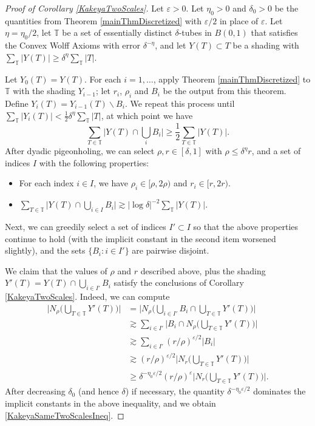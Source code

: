 \documentclass[letterpaper, reqno,11pt]{article}
\numberwithin{equation}{section}
\newcommand{\eps}{\varepsilon}
\newcommand{\tubes}{\mathbb{T}}
\numberwithin{thm}{section}
\theoremstyle{remark}
\begin{document}
\begin{proof}[Proof of Corollary \ref{KakeyaTwoScales}]
Let $\eps>0$. Let $\eta_0>0$ and $\delta_0>0$ be the quantities from Theorem \ref{mainThmDiscretized} with $\eps/2$ in place of $\eps$. Let $\eta=\eta_0/2$, let $\tubes$ be a set of essentially distinct $\delta$-tubes in $B(0,1)$ that satisfies the Convex Wolff Axioms with error $\delta^{-\eta}$, and let $Y(T)\subset T$ be a shading with $\sum_{\tubes}|Y(T)|\geq \delta^{\eta}\sum_{\tubes}|T|$. 

Let $Y_0(T)=Y(T)$. For each $i=1,\ldots$,  apply Theorem \ref{mainThmDiscretized} to $\tubes$ with the shading $Y_{i-1}$; let $r_i$, $\rho_i$ and $B_i$ be the output from this theorem. Define $Y_i(T) = Y_{i-1}(T)\backslash B_i$. We repeat this process until $\sum_{\tubes}|Y_i(T)|<\frac{1}{2}\delta^{\eta}\sum_{\tubes}|T|$, at which point we have
\[
\sum_{T\in\tubes}\Big| Y(T) \cap \bigcup_i B_i\Big| \geq \frac{1}{2}\sum_{T\in\tubes}|Y(T)|.
\]
After dyadic pigeonholing, we can select $\rho,r\in[\delta,1]$ with $\rho\leq\delta^\eta r$, and a set of indices $I$ with the following properties:
\begin{itemize}
\item For each index $i\in I$, we have $\rho_i\in [\rho, 2\rho)$ and $r_i\in [r, 2r)$.
\item $\sum_{T\in\tubes}\Big| Y(T) \cap \bigcup_{i\in I} B_i\Big| \gtrsim|\log\delta|^{-2}\sum_{\tubes}|Y(T)|.$
\end{itemize}

Next, we can greedily select a set of indices $I'\subset I$ so that the above properties continue to hold (with the implicit constant in the second item worsened slightly), and the sets $\{B_i\colon i\in I'\}$ are pairwise disjoint. 

We claim that the values of $\rho$ and $r$ described above, plus the shading $Y'(T) = Y(T)\cap \bigcup_{i\in I'} B_i$ satisfy the conclusions of Corollary \ref{KakeyaTwoScales}. Indeed, we can compute 
\begin{align*}
\Big| N_{\rho}\Big(\bigcup_{T\in\tubes}Y'(T)\Big)\Big| & =  \Big| N_{\rho}\Big(\bigcup_{i\in I'}B_i \cap \bigcup_{T\in\tubes}Y'(T)\Big)\Big| \\
&\gtrsim \sum_{i\in I'}\Big| B_i \cap N_\rho\Big(\bigcup_{T\in\tubes}Y'(T)\Big)\Big|\\
&\gtrsim \sum_{i\in I'} (r/\rho)^{\eps/2} |B_i| \\
&\gtrsim (r/\rho)^{\eps/2} \Big|N_{r}\Big(\bigcup_{T\in\tubes}Y'(T)\Big)\Big|\\
& \geq  \delta^{-\eta_0\eps/2}(r/\rho)^{\eps} \Big|N_{r}\Big(\bigcup_{T\in\tubes}Y'(T)\Big)\Big|.
\end{align*}
After decreasing $\delta_0$ (and hence $\delta$) if necessary, the quantity $\delta^{-\eta_0\eps/2}$ dominates the implicit constants in the above inequality, and we obtain \eqref{KakeyaSameTwoScalesIneq}.
\end{proof}
\end{document}
